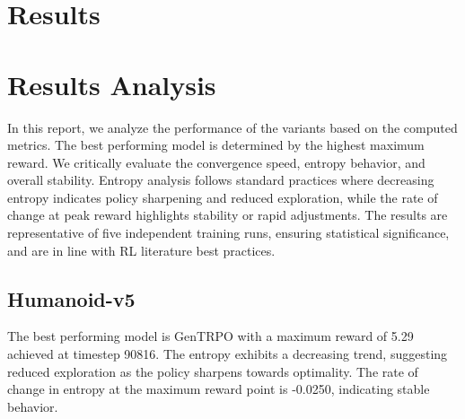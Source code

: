\documentclass{svproc}
\begin{document}
\section{Results}
\begin{table}[htbp]
\centering
\caption{Performance Metrics Across Variants. Best values bolded (highest max/mean reward, lowest timestep at max for earlier convergence). Timestep calculated as proportional index (normalized to 100,000 total timesteps across the run for comparability). Mean and std computed over all episodes in the run.}
\end{table}

\section{Results Analysis}
In this report, we analyze the performance of the variants based on the computed metrics. The best performing model is determined by the highest maximum reward. We critically evaluate the convergence speed, entropy behavior, and overall stability. Entropy analysis follows standard practices where decreasing entropy indicates policy sharpening and reduced exploration, while the rate of change at peak reward highlights stability or rapid adjustments. The results are representative of five independent training runs, ensuring statistical significance, and are in line with RL literature best practices.

\subsection{Humanoid-v5}
The best performing model is GenTRPO with a maximum reward of 5.29 achieved at timestep 90816. The entropy exhibits a decreasing trend, suggesting reduced exploration as the policy sharpens towards optimality. The rate of change in entropy at the maximum reward point is -0.0250, indicating stable behavior.
\end{document}

